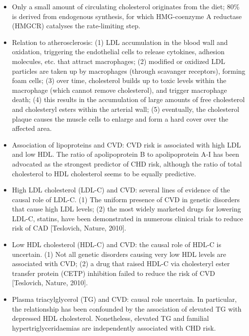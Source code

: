 \documentclass{report}
\begin{document}
\begin{enumerate}
\begin{itemize}
\item Only a small amount of circulating cholesterol originates from the diet; 80\% is derived from endogenous synthesis, for which HMG-coenzyme A reductase (HMGCR) catalyses the rate-limiting step.

\item Relation to atherosclerosis: (1) LDL accumulation in the blood wall and oxidation, triggering the endothelial cells to release cytokines, adhesion molecules, etc. that attract macrophages; (2) modified or oxidized LDL particles are taken up by macrophages (through scavanger receptors), forming foam cells; (3) over time, cholesterol builds up to toxic levels within the macrophage (which cannot remove cholesterol), and trigger macrophage death; (4) this results in the accumulation of large amounts of free cholesterol and cholesteryl esters within the arterial wall; (5) eventually, the cholesterol plaque causes the muscle cells to enlarge and form a hard cover over the affected area.

\item Association of lipoproteins and CVD: CVD risk is associated with high LDL and low HDL. The ratio of apolipoprotein B to apolipoprotein A-I has been advocated as the strongest predictor of CHD risk, although the ratio of total cholesterol to HDL cholesterol seems to be equally predictive. 

\item High LDL cholesterol (LDL-C) and CVD: several lines of evidence of the causal role of LDL-C. (1) The uniform presence of CVD in genetic disorders that cause high LDL levels; (2) the most widely marketed drugs for lowering LDL-C, statins, have been demonstrated in numerous clinical trials to reduce risk of CAD [Teslovich, Nature, 2010].

\item Low HDL cholesterol (HDL-C) and CVD: the causal role of HDL-C is uncertain. (1) Not all genetic disorders causing very low HDL levels are associated with CVD; (2) a drug that raised HDL-C via cholesteryl ester transfer protein (CETP) inhibition failed to reduce the risk of CVD [Teslovich, Nature, 2010]. 

\item Plasma triacylglycerol (TG) and CVD: causal role uncertain. In particular, the relationship has been confounded by the association of elevated TG with depressed HDL cholesterol. Nonetheless, elevated TG and familial hypertriglyceridaemias are independently associated with CHD risk.
\end{itemize}


\end{enumerate}
\end{document}
